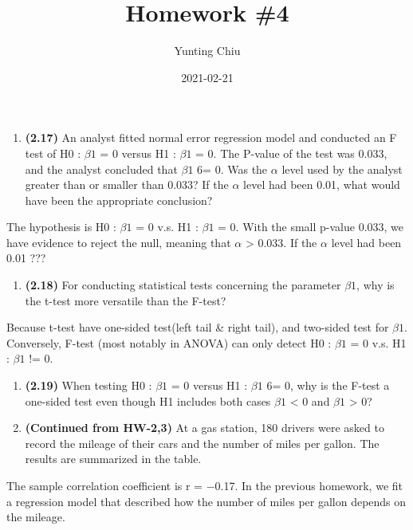 \documentclass[
]{article}
\title{Homework \#4}
\author{Yunting Chiu}
\date{2021-02-21}
\providecommand{\tightlist}{%
  \setlength{\itemsep}{0pt}\setlength{\parskip}{0pt}}
\begin{document}
\maketitle

\begin{enumerate}
\def\labelenumi{\arabic{enumi}.}
\tightlist
\item
  \textbf{(2.17)} An analyst fitted normal error regression model and
  conducted an F test of H0 : \(\beta1\) = 0 versus H1 : \(\beta1\) = 0.
  The P-value of the test was 0.033, and the analyst concluded that
  \(\beta1\) 6= 0. Was the \(\alpha\) level used by the analyst greater
  than or smaller than 0.033? If the \(\alpha\) level had been 0.01,
  what would have been the appropriate conclusion?
\end{enumerate}

The hypothesis is H0 : \(\beta1\) = 0 v.s. H1 : \(\beta1\) = 0. With the
small p-value 0.033, we have evidence to reject the null, meaning that
\(\alpha\) \textgreater{} 0.033. If the \(\alpha\) level had been 0.01
???

\begin{enumerate}
\def\labelenumi{\arabic{enumi}.}
\setcounter{enumi}{1}
\tightlist
\item
  \textbf{(2.18)} For conducting statistical tests concerning the
  parameter \(\beta1\), why is the t-test more versatile than the
  F-test?
\end{enumerate}

Because t-test have one-sided test(left tail \& right tail), and
two-sided test for \(\beta1\). Conversely, F-test (most notably in
ANOVA) can only detect H0 : \(\beta1\) = 0 v.s. H1 : \(\beta1\) != 0.

\begin{enumerate}
\def\labelenumi{\arabic{enumi}.}
\setcounter{enumi}{2}
\item
  \textbf{(2.19)} When testing H0 : \(\beta1\) = 0 versus H1 :
  \(\beta1\) 6= 0, why is the F-test a one-sided test even though H1
  includes both cases \(\beta1\) \textless{} 0 and \(\beta1\)
  \textgreater{} 0?
\item
  \textbf{(Continued from HW-2,3)} At a gas station, 180 drivers were
  asked to record the mileage of their cars and the number of miles per
  gallon. The results are summarized in the table.
\end{enumerate}

The sample correlation coefficient is r = −0.17. In the previous
homework, we fit a regression model that described how the number of
miles per gallon depends on the mileage.
\end{document}
